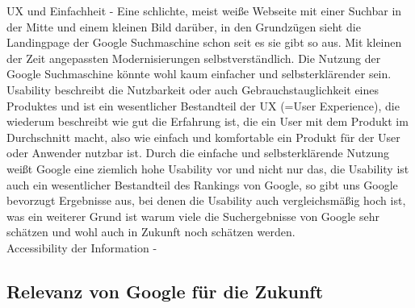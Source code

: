 \documentclass[11pt]{report}
\begin{document}
    UX und Einfachheit - Eine schlichte, meist weiße Webseite mit einer Suchbar in der Mitte und einem kleinen Bild darüber, in den Grundzügen sieht die Landingpage der Google Suchmaschine schon seit es sie gibt so aus.
    Mit kleinen der Zeit angepassten Modernisierungen selbstverständlich.
    Die Nutzung der Google Suchmaschine könnte wohl kaum einfacher und selbsterklärender sein.
    Usability beschreibt die Nutzbarkeit oder auch Gebrauchstauglichkeit eines Produktes und ist ein wesentlicher Bestandteil der UX (=User Experience), die wiederum beschreibt wie gut die Erfahrung ist, die ein User mit dem Produkt im Durchschnitt macht, also wie einfach und komfortable ein Produkt für der User oder Anwender nutzbar ist.\cite{[MAU22]}
    Durch die einfache und selbsterklärende Nutzung weißt Google eine ziemlich hohe Usability vor und nicht nur das, die Usability ist auch ein wesentlicher Bestandteil des Rankings von Google, so gibt uns Google bevorzugt Ergebnisse aus, bei denen die Usability auch vergleichsmäßig hoch ist, was ein weiterer Grund ist warum viele die Suchergebnisse von Google sehr schätzen und wohl auch in Zukunft noch schätzen werden.\cite{[LIC15]}\\

    Accessibility der Information -





    \subsection{Relevanz von Google für die Zukunft}\label{subsec:relevanz-von-google-fur-die-zukunft}
\end{document}
